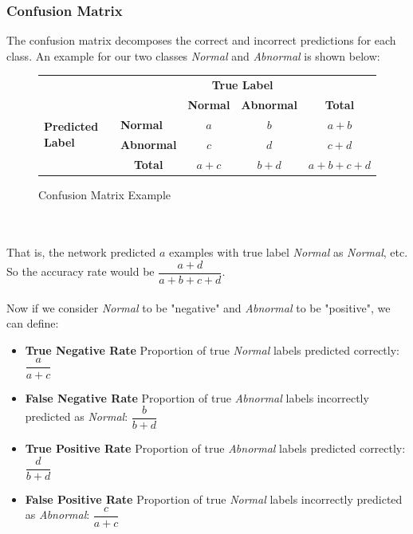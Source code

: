 \documentclass[11pt]{article} %
\theoremstyle{plain}
\theoremstyle{definition}
\begin{document}
\subsubsection{Confusion Matrix}
The confusion matrix decomposes the correct and incorrect predictions for each class. An example for our two classes \textit{Normal} and \textit{Abnormal} is shown below:
\begin{figure}[ht]
    \centering
  \caption{Confusion Matrix Example}
    \begin{tabular}{l|l|c|c|c}
    \multicolumn{2}{c}{}&\multicolumn{2}{c}{\textbf{True Label}}&\\
    \cline{3-4}
    \multicolumn{2}{c|}{}&\textbf{Normal}&\textbf{Abnormal}&\multicolumn{1}{c}{\textbf{Total}}\\
    \cline{2-4}
    \multirow{2}{*}{\textbf{Predicted Label}}& \textbf{Normal} & $a$ & $b$ & $a+b$\\
    \cline{2-4}
    & \textbf{Abnormal} & $c$ & $d$ & $c+d$\\
    \cline{2-4}
    \multicolumn{1}{c}{} & \multicolumn{1}{c}{\textbf{Total}} & \multicolumn{1}{c}{$a+c$} & \multicolumn{1}{c}{$b+d$} & \multicolumn{1}{c}{$a+b+c+d$}\\
    \end{tabular}
    \label{fig:confusion_matrix_example}
\end{figure}
\\
\\
\noindent
That is, the network predicted \(a\) examples with true label \textit{Normal} as \textit{Normal}, etc. So the accuracy rate would be \( \dfrac{a+d}{a+b+c+d}\). 
\\
\\
\noindent
Now if we consider \textit{Normal} to be "negative" and \textit{Abnormal} to be "positive", we can define:
\begin{itemize}
  \item \textbf{True Negative Rate} Proportion of true \textit{Normal} labels predicted correctly: \( \dfrac{a}{a+c} \)
  \item \textbf{False Negative Rate} Proportion of true \textit{Abnormal} labels incorrectly predicted as \textit{Normal}: \( \dfrac{b}{b+d} \)
  \item \textbf{True Positive Rate} Proportion of true \textit{Abnormal} labels predicted correctly:  \( \dfrac{d}{b+d} \)
  \item \textbf{False Positive Rate} Proportion of true \textit{Normal} labels incorrectly predicted as \textit{Abnormal}: \( \dfrac{c}{a+c} \)
\end{itemize}
\end{document}
